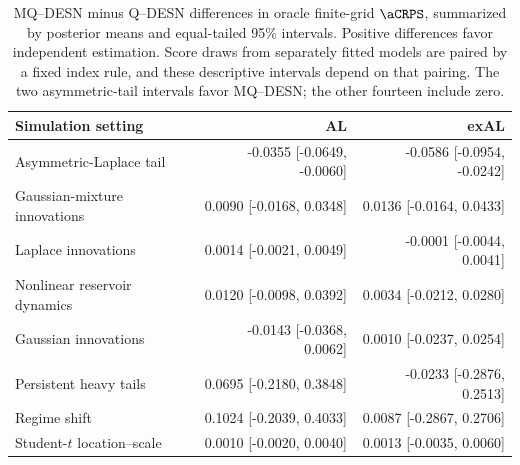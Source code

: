 \begin{table}[!htbp]
\centering
\footnotesize
\setlength{\tabcolsep}{3pt}
\renewcommand{\arraystretch}{1.08}
\begin{tabular}{@{}>{\raggedright\arraybackslash}p{}rr@{}}
\toprule
Simulation setting & AL & exAL \\
\midrule
Asymmetric-Laplace tail & -0.0355 [-0.0649, -0.0060] & -0.0586 [-0.0954, -0.0242] \\
Gaussian-mixture innovations & 0.0090 [-0.0168, 0.0348] & 0.0136 [-0.0164, 0.0433] \\
Laplace innovations & 0.0014 [-0.0021, 0.0049] & -0.0001 [-0.0044, 0.0041] \\
Nonlinear reservoir dynamics & 0.0120 [-0.0098, 0.0392] & 0.0034 [-0.0212, 0.0280] \\
Gaussian innovations & -0.0143 [-0.0368, 0.0062] & 0.0010 [-0.0237, 0.0254] \\
Persistent heavy tails & 0.0695 [-0.2180, 0.3848] & -0.0233 [-0.2876, 0.2513] \\
Regime shift & 0.1024 [-0.2039, 0.4033] & 0.0087 [-0.2867, 0.2706] \\
Student-\(t\) location--scale & 0.0010 [-0.0020, 0.0040] & 0.0013 [-0.0035, 0.0060] \\
\bottomrule
\end{tabular}
\caption{MQ--DESN minus Q--DESN differences in oracle finite-grid \(\aCRPS\), summarized by posterior means and equal-tailed 95\% intervals. Positive differences favor independent estimation. Score draws from separately fitted models are paired by a fixed index rule, and these descriptive intervals depend on that pairing. The two asymmetric-tail intervals favor MQ--DESN; the other fourteen include zero.}
\label{tab:joint-qdesn-pure-desn-v2-contrasts}
\end{table}

